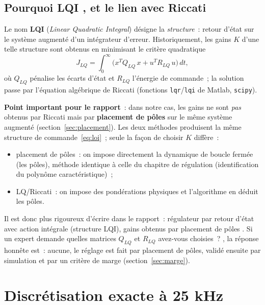 \documentclass[a4paper,11pt]{article}
\begin{document}
\subsection{Pourquoi \og LQI \fg{}, et le lien avec Riccati}
\label{subsec:pourquoilqi}

Le nom \textbf{LQI} (\emph{Linear Quadratic Integral}) désigne la
\emph{structure}~: retour d'état sur le système augmenté d'un intégrateur
d'erreur. Historiquement, les gains $K$ d'une telle structure sont obtenus en
minimisant le critère quadratique
\begin{equation}
    J_{LQ} = \int_0^{\infty} \big( x^T Q_{LQ}\, x + u^T R_{LQ}\, u \big)\,dt,
\end{equation}
où $Q_{LQ}$ pénalise les écarts d'état et $R_{LQ}$ l'énergie de commande~; la
solution passe par l'équation algébrique de Riccati (fonctions
\texttt{lqr}/\texttt{lqi} de Matlab, \texttt{scipy}).

\textbf{Point important pour le rapport}~: dans notre cas, les gains ne sont
\emph{pas} obtenus par Riccati mais par \textbf{placement de pôles} sur le
même système augmenté (section~\ref{sec:placement}). Les deux méthodes
produisent la même structure de commande~\eqref{eq:loi}~; seule la façon de
choisir $K$ diffère~:
\begin{itemize}
    \item placement de pôles~: on impose directement la dynamique de boucle
          fermée (les pôles), méthode identique à celle du chapitre de
          régulation (identification du polynôme caractéristique)~;
    \item LQ/Riccati~: on impose des pondérations physiques et l'algorithme en
          déduit les pôles.
\end{itemize}
Il est donc plus rigoureux d'écrire dans le rapport~: \og régulateur par
retour d'état avec action intégrale (structure LQI), gains obtenus par
placement de pôles \fg. Si un expert demande \og quelles matrices $Q_{LQ}$ et
$R_{LQ}$ avez-vous choisies~? \fg, la réponse honnête est~: aucune, le réglage
est fait par placement de pôles, validé ensuite par simulation et par un
critère de marge (section~\ref{sec:marge}).

\section{Discrétisation exacte à 25 kHz}
\label{sec:disc}
\end{document}
